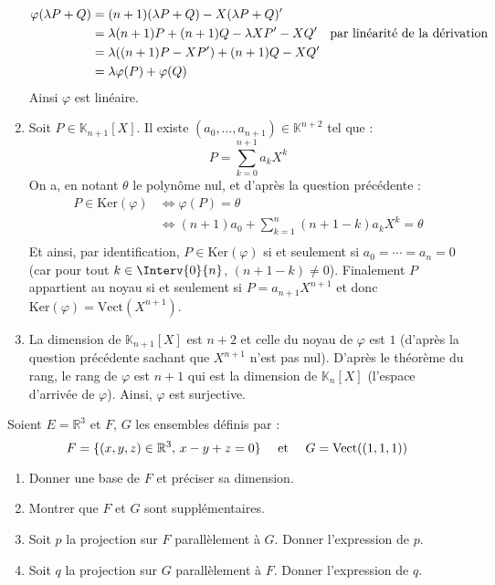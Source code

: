 \documentclass[a4paper,10pt]{report}
\begin{document}
\begin{enumerate}
\begin{align*}
\varphi(\lambda P + Q) & = (n+1)(\lambda P+Q)-X(\lambda P + Q)' \\
& = \lambda (n+1)P + (n+1)Q - \lambda X P' - XQ' \quad \hbox{par linéarité de la dérivation} \\
& = \lambda ((n+1)P-XP') + (n+1)Q-XQ' \\
& = \lambda \varphi(P) + \varphi(Q) 
\end{align*}
Ainsi $\varphi$ est linéaire.
\item Soit $P \in \mathbb{K}_{n+1}[X]$. Il existe $(a_0, \ldots, a_{n+1}) \in \mathbb{K}^{n+2}$ tel que :
$$ P = \sum_{k=0}^{n+1} a_k X^k $$
On a, en notant $\theta$ le polynôme nul, et d'après la question précédente : 
\begin{align*}
P \in \textrm{Ker}(\varphi) & \Longleftrightarrow  \varphi(P) = \theta \\
& \Longleftrightarrow (n+1) a_0 + \sum_{k=1}^n (n+1-k) a_k X^k =\theta  \\
\end{align*}
Et ainsi, par identification, $P \in \textrm{Ker}(\varphi)$ si et seulement si $a_0 = \cdots = a_n = 0$ (car pour tout $k \in \Interv{0}{n}$, $(n+1-k) \neq 0$). Finalement $P$ appartient au noyau si et seulement si $P = a_{n+1} X^{n+1}$ et donc $\textrm{Ker}(\varphi)= \textrm{Vect}(X^{n+1})$.
\item La dimension de $\mathbb{K}_{n+1}[X]$ est $n+2$ et celle du noyau de $\varphi$ est $1$ (d'après la question précédente sachant que $X^{n+1}$ n'est pas nul). D'après le théorème du rang, le rang de $\varphi$ est $n+1$ qui est la dimension de $\mathbb{K}_n[X]$ (l'espace d'arrivée de $\varphi$). Ainsi, $\varphi$ est surjective.
\end{enumerate}



\begin{Exercice}{} Soient $E= \mathbb{R}^3$ et $F$, $G$ les ensembles définis par :
$$ F = \lbrace (x,y,z) \in \mathbb{R}^3, \, x-y+z=0 \rbrace \quad \hbox{ et }  \quad G = \textrm{Vect}((1,1,1)) $$

\begin{enumerate}
\item Donner une base de $F$ et préciser sa dimension.
\item Montrer que $F$ et $G$ sont supplémentaires.
\item Soit $p$ la projection sur $F$ parallèlement à $G$. Donner l'expression de $p$.
\item Soit $q$ la projection sur $G$ parallèlement à $F$. Donner l'expression de $q$.
\end{enumerate}
\end{Exercice}
\end{document}
